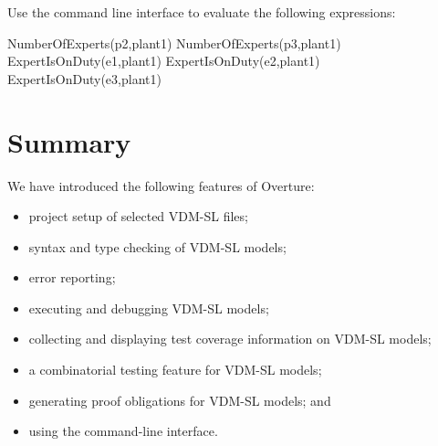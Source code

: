 \begin{myexercise}
\label{ex:tool-monitor}Use the command line interface to evaluate the following expressions:
\begin{vdmsl}
NumberOfExperts(p2,plant1)
NumberOfExperts(p3,plant1)
ExpertIsOnDuty(e1,plant1)
ExpertIsOnDuty(e2,plant1)
ExpertIsOnDuty(e3,plant1)
\end{vdmsl}
\end{myexercise}

%
\lstset{style=mystyle}


\section{Summary}

We have introduced the following features of Overture:
%
\begin{itemize}
\item project setup of selected VDM-SL files;
\item syntax and type checking of VDM-SL models;
\item error reporting;
\item executing and debugging VDM-SL models; 
\item collecting and displaying test coverage information on VDM-SL
  models;
\item a combinatorial testing feature for VDM-SL models;
\item generating proof obligations for VDM-SL models; and
\item using the command-line interface. 
\end{itemize}
%

